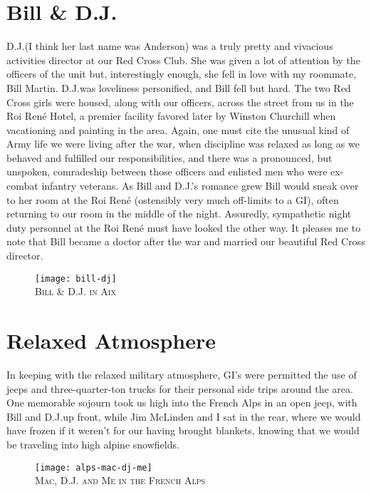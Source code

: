 \documentclass[../m3y]{subfiles}
\begin{document}
\section{Bill \& D.J.\@}
D.J.\@ (I think her last name was Anderson) was a truly pretty and vivacious activities director at our Red Cross Club. She was given a lot of attention by the officers of the unit but, interestingly enough, she fell in love with my roommate, Bill Martin. D.J.\@ was loveliness personified, and Bill fell but hard. The two Red Cross girls were housed, along with our officers, across the street from us in the Roi Ren\'e Hotel, a premier facility favored later by Winston Churchill when vacationing and painting in the area. Again, one must cite the unusual kind of Army life we were living after the war, when discipline was relaxed as long as we behaved and fulfilled our responsibilities, and there was a pronounced, but unspoken, comradeship between those officers and enlisted men who were ex-combat infantry veterans. As Bill and D.J.'s romance grew Bill would sneak over to her room at the Roi Ren\'e (ostensibly very much off-limits to a GI), often returning to our room in the middle of the night. Assuredly, sympathetic night duty personnel at the Roi Ren\'e must have looked the other way. It pleases me to note that Bill became a doctor after the war and married our beautiful Red Cross director.

\begin{figure}[h]
\centering
\texttt{[image: bill-dj]}\\
\medskip
{\newtimes\textsc{Bill \& D.J. in Aix}}
\end{figure}

\section{Relaxed Atmosphere}
In keeping with the relaxed military atmosphere, GI's were permitted the use of jeeps and three-quarter-ton trucks for their personal side trips around the area. One memorable sojourn took us high into the French Alps in an open jeep, with Bill and D.J.\@ up front, while Jim McLinden and I sat in the rear, where we would have frozen if it weren't for our having brought blankets, knowing that we would be traveling into high alpine snowfields.

\begin{figure}[h]
\centering
\texttt{[image: alps-mac-dj-me]}\\
\medskip
{\newtimes\textsc{Mac, D.J. and Me in the French Alps}}
\end{figure}
\end{document}
